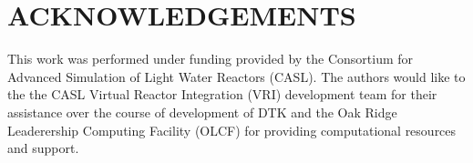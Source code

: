 \documentclass{mc2013}
\begin{document}
\section*{ACKNOWLEDGEMENTS}

This work was performed under funding provided by the Consortium for
Advanced Simulation of Light Water Reactors (CASL). The authors would
like to the the CASL Virtual Reactor Integration (VRI) development
team for their assistance over the course of development of DTK and
the Oak Ridge Leaderership Computing Facility (OLCF) for providing
computational resources and support.

\setlength{\baselineskip}{12pt}


\end{document}
